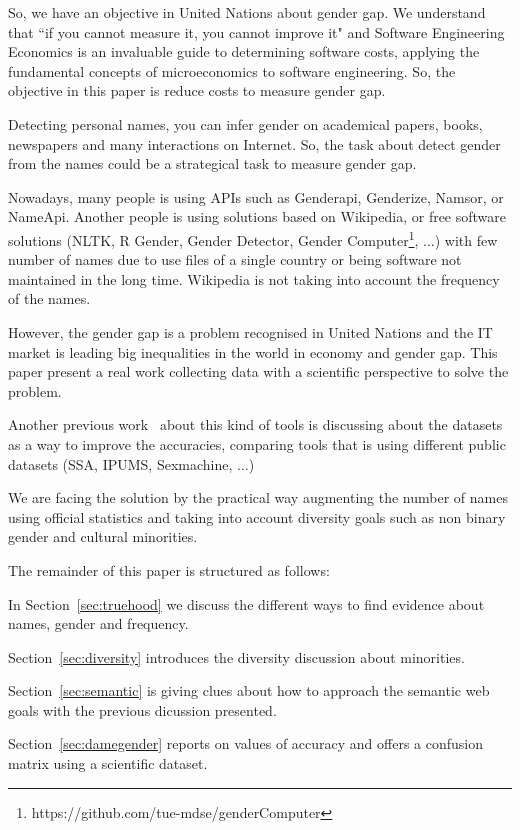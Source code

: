 \documentclass[a4paper]{article}
\begin{document}
So, we have an objective in United Nations about gender gap. We
understand that ``if you cannot measure it, you cannot improve it" and
Software Engineering Economics is an invaluable guide to determining
software costs, applying the fundamental concepts of microeconomics to
software engineering. So, the objective in this paper is reduce costs
to measure gender gap.

Detecting personal names, you can infer gender on academical papers,
books, newspapers and many interactions on Internet. So, the task
about detect gender from the names could be a strategical task to
measure gender gap.

Nowadays, many people is using APIs such as Genderapi, Genderize,
Namsor, or NameApi. Another people is using solutions based on
Wikipedia, or free software solutions (NLTK\cite{loper2002nltk}, R
Gender, Gender Detector, Gender
Computer\footnote{https://github.com/tue-mdse/genderComputer}, ...)
with few number of names due to use files of a single country or being
software not maintained in the long time. Wikipedia is not taking into
account the frequency of the names.

However, the gender gap is a problem recognised in United Nations and
the IT market is leading big inequalities in the world in economy and
gender gap. This paper present a real work collecting data with a
scientific perspective to solve the problem.

Another previous work~\cite{karimi2016inferring} about this kind of
tools is discussing about the datasets as a way to improve the
accuracies, comparing tools that is using different public datasets
(SSA, IPUMS, Sexmachine, ...)

We are facing the solution by the practical way augmenting the number
of names using official statistics and taking into account diversity
goals such as non binary gender and cultural minorities.

The remainder of this paper is structured as follows:

In Section~\ref{sec:truehood} we discuss the different ways to find
evidence about names, gender and frequency.

Section~\ref{sec:diversity} introduces the diversity discussion about
minorities.

Section~\ref{sec:semantic} is giving clues about how to approach the
semantic web goals with the previous dicussion presented.

Section~\ref{sec:damegender} reports on values of accuracy and offers
a confusion matrix using a scientific dataset.
\end{document}
